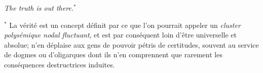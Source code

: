 \documentclass{article}
\begin{document}
\newpage

\begin{titlepage} 
\clearpage
\thispagestyle{empty}
\pagecolor{yellow!10}

\vspace*{\baselineskip} 	
	
	\vspace*{0.167\textheight} 
	
\centerline{\textsl{The truth is out there.}$^*$}
  \vfill
  {\scriptsize \noindent $^*$ La vérité est un concept définit par ce que l'on pourrait appeler un \textit{cluster polysémique nodal fluctuant}, et est par conséquent loin d'être universelle et absolue; n'en déplaise aux gens de pouvoir pétris de certitudes, souvent au service de dogmes ou d'oligarques dont ils n'en comprennent que rarement les conséquences destructrices induites.}
  


\end{titlepage}
\end{document}
